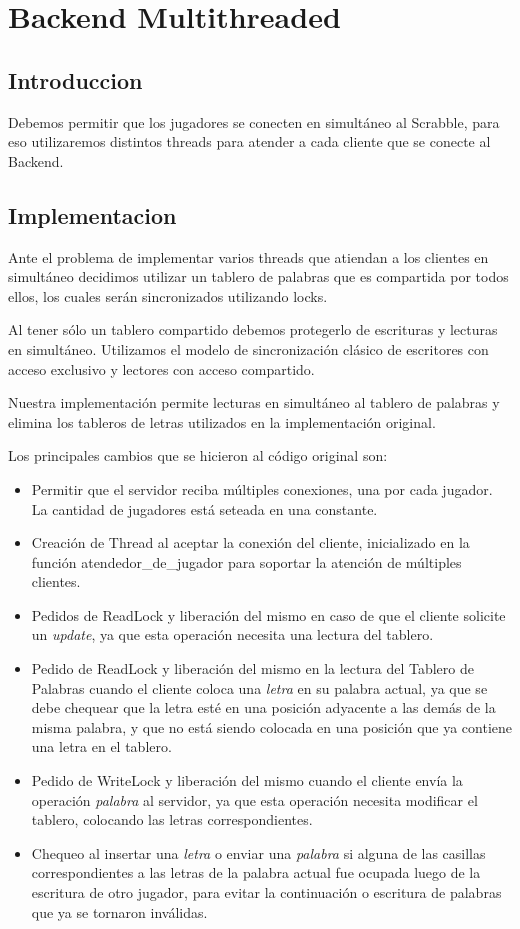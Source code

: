 \section{Backend Multithreaded}
\subsection{Introduccion}
Debemos permitir que los jugadores se conecten en simultáneo al Scrabble, para eso utilizaremos distintos threads para atender a cada cliente que se conecte al Backend.

\subsection{Implementacion}
Ante el problema de implementar varios threads que atiendan a los clientes en simultáneo decidimos utilizar un tablero de palabras que es compartida por todos ellos, los cuales serán sincronizados utilizando locks.

Al tener sólo un tablero compartido debemos protegerlo de escrituras y lecturas en simultáneo. Utilizamos el modelo de sincronización clásico de escritores con acceso exclusivo y lectores con acceso compartido.

Nuestra implementación permite lecturas en simultáneo al tablero de palabras y elimina los tableros de letras utilizados en la implementación original.

Los principales cambios que se hicieron al código original son:

\begin{itemize}
	\item Permitir que el servidor reciba múltiples conexiones, una por cada jugador.  La cantidad de jugadores está seteada en una constante.
	\item Creación de Thread al aceptar la conexión del cliente, inicializado en la función {\sc atendedor_de_jugador} para soportar la atención de múltiples clientes.
    \item Pedidos de ReadLock y liberación del mismo en caso de que el cliente solicite un {\it update}, ya que esta operación necesita una lectura del tablero.
    \item Pedido de ReadLock y liberación del mismo en la lectura del Tablero de Palabras cuando el cliente coloca una {\it letra} en su palabra actual, ya que se debe chequear que la letra esté en una posición adyacente a las demás de la misma palabra, y que no está siendo colocada en una posición que ya contiene una letra en el tablero.
    \item Pedido de WriteLock y liberación del mismo cuando el cliente envía la operación {\it palabra} al servidor, ya que esta operación necesita modificar el tablero, colocando las letras correspondientes.
    \item Chequeo al insertar una {\it letra} o enviar una {\it palabra} si alguna de las casillas correspondientes a las letras de la palabra actual fue ocupada luego de la escritura de otro jugador, para evitar la continuación o escritura de palabras que ya se tornaron inválidas.
\end{itemize}
